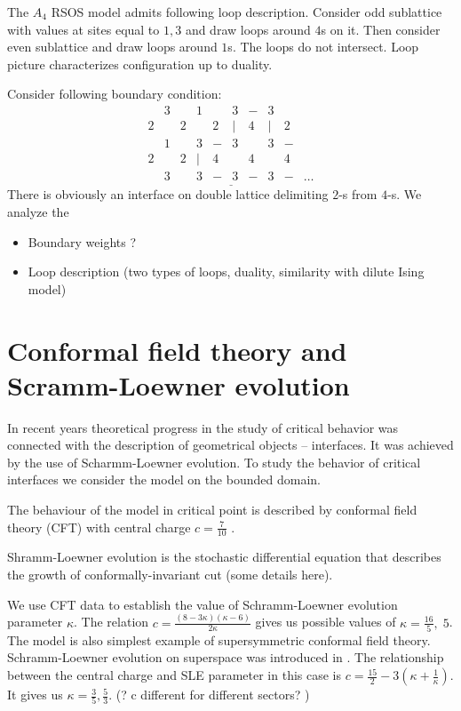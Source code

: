 \documentclass[12pt]{article}
\begin{document}
The $A_4$ RSOS model admits following loop description. Consider odd
sublattice with values at sites equal to $1,3$ and draw loops around
$4$s on it. Then consider even sublattice and draw loops around $1$s.
The loops do not intersect. Loop picture characterizes configuration
up to duality. 


Consider following boundary condition:
\begin{equation}
  \label{eq:13}
  \underline{\begin{array}{llllllllll}
    & 3 & & 1 &  & 3 & - & 3 & & \\
    2 & & 2 &  & 2 & | & 4 & | & 2\\
    & 1 & & 3 & - & 3 & & 3 &- & \\
    2 & & 2 & | & 4 & & 4 & & 4\\
    &  3 & & 3 &- & 3 &- & 3 &- &\dots
  \end{array}}
\end{equation}
There is obviously an interface on double lattice delimiting $2$-s from $4$-s. We analyze the

\begin{itemize}
\item Boundary weights ?
\item Loop description (two types of loops, duality, similarity with dilute Ising model) 
\end{itemize}

\section{Conformal field theory and Scramm-Loewner evolution}
\label{sec:conf-field-theory}



In recent
years theoretical progress in the study of critical behavior was connected with the description of
geometrical objects -- interfaces. It was achieved by the use of Scharmm-Loewner evolution. To study
the behavior of critical interfaces we consider the model on the bounded domain. 

The behaviour of the model in critical
point is described by conformal field theory (CFT) with central charge $c=\frac{7}{10}$
\cite{friedan1985superconformal}. 

Shramm-Loewner evolution is the stochastic differential equation that describes the growth of
conformally-invariant cut (some details here).

We use CFT data to establish the value of Schramm-Loewner evolution parameter $\kappa$. The relation
$c=\frac{(8-3\kappa)(\kappa-6)}{2\kappa}$ gives us possible values of $\kappa=\frac{16}{5},\; 5$.
The model is also simplest example of supersymmetric conformal field theory. Schramm-Loewner
evolution on superspace was introduced in \cite{nagi2005stochastic,rasmussen2004stochastic}. The
relationship between the central charge and SLE parameter in this case is
$c=\frac{15}{2}-3\left(\kappa+\frac{1}{\kappa}\right)$. It gives us
$\kappa=\frac{3}{5},\frac{5}{3}$. (? c different for different sectors? )
\end{document}
